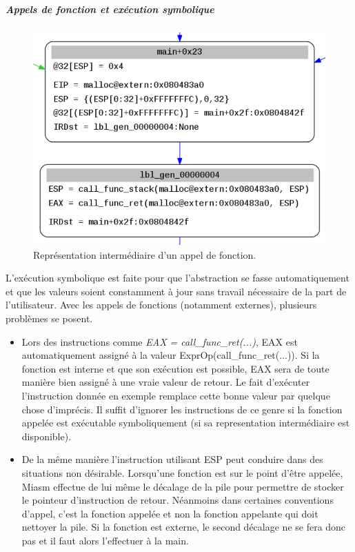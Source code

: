 \subparagraph{Appels de fonction et exécution symbolique}
\begin{figure}[h]
    \centering
    \includegraphics[scale=0.3]{ir.png}\newline
    \caption{Représentation intermédiaire d'un appel de fonction.}
\end{figure}
L'exécution symbolique est faite pour que l'abstraction se fasse automatiquement et que les valeurs soient constamment à jour sans travail nécessaire de la part de l'utilisateur. Avec les appels de
fonctions (notamment externes), plusieurs problèmes se posent.
\begin{itemize}
    \item Lors des instructions comme \textit{EAX = call\_func\_ret(...)}, EAX est automatiquement assigné à la valeur ExprOp(call\_func\_ret(...)). Si la fonction est interne et que
    son exécution est possible, EAX sera de toute manière bien assigné à une vraie valeur de retour. Le fait d'exécuter l'instruction donnée en exemple remplace cette bonne valeur par quelque
    chose d'imprécis.\newline
    Il suffit d'ignorer les instructions de ce genre si la fonction appelée est exécutable symboliquement (si sa representation intermédiaire est disponible).
    \item De la même manière l'instruction utilisant ESP peut conduire dans des situations non désirable. Lorsqu'une fonction est sur le point d'être appelée, Miasm effectue de lui même le décalage de la pile pour permettre de stocker le pointeur d'instruction de retour.\newline
    Néanmoins dans certaines conventions d'appel, c'est la fonction appelée et non la fonction appelante qui doit nettoyer la pile. Si la fonction est externe, le second décalage ne se fera donc pas et il faut alors l'effectuer à la main.
\end{itemize}

